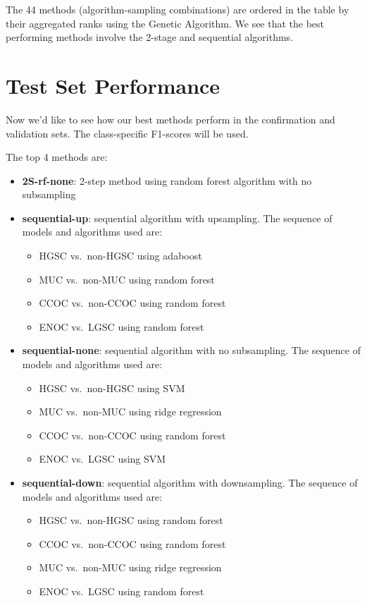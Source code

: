 \documentclass[
]{report}
\providecommand{\tightlist}{%
  \setlength{\itemsep}{0pt}\setlength{\parskip}{0pt}}
\begin{document}
The 44 methods (algorithm-sampling combinations) are ordered in the table by their aggregated ranks using the Genetic Algorithm. We see that the best performing methods involve the 2-stage and sequential algorithms.

\hypertarget{test-set-performance}{%
\section{Test Set Performance}\label{test-set-performance}}

Now we'd like to see how our best methods perform in the confirmation and validation sets. The class-specific F1-scores will be used.

The top 4 methods are:

\begin{itemize}
\tightlist
\item
  \textbf{2S-rf-none}: 2-step method using random forest algorithm with no subsampling
\item
  \textbf{sequential-up}: sequential algorithm with upsampling. The sequence of models and algorithms used are:

  \begin{itemize}
  \tightlist
  \item
    HGSC vs.~non-HGSC using adaboost
  \item
    MUC vs.~non-MUC using random forest
  \item
    CCOC vs.~non-CCOC using random forest
  \item
    ENOC vs.~LGSC using random forest
  \end{itemize}
\item
  \textbf{sequential-none}: sequential algorithm with no subsampling. The sequence of models and algorithms used are:

  \begin{itemize}
  \tightlist
  \item
    HGSC vs.~non-HGSC using SVM
  \item
    MUC vs.~non-MUC using ridge regression
  \item
    CCOC vs.~non-CCOC using random forest
  \item
    ENOC vs.~LGSC using SVM
  \end{itemize}
\item
  \textbf{sequential-down}: sequential algorithm with downsampling. The sequence of models and algorithms used are:

  \begin{itemize}
  \tightlist
  \item
    HGSC vs.~non-HGSC using random forest
  \item
    CCOC vs.~non-CCOC using random forest
  \item
    MUC vs.~non-MUC using ridge regression
  \item
    ENOC vs.~LGSC using random forest
  \end{itemize}
\end{itemize}
\end{document}
